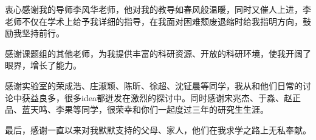 
\begin{acknowledgements}
  衷心感谢我的导师李风华老师，他对我的教导如春风般温暖，同时又催人上进，李老师不仅在学术上给予我详细的指导，在我面对困难颓废退缩时给我指明方向，鼓励我坚持前行。

  感谢课题组的其他老师，为我提供丰富的科研资源、开放的科研环境，使我开阔了眼界，增长了能力。

  感谢实验室的荣成浩、庄淑颖、陈昕、徐超、沈钲晨等同学，我从和他们日常的讨论中获益良多，很多idea都迸发在激烈的探讨中。同时感谢宋兆杰、于淼、赵正品、蓝天鸣、李果等同学，很荣幸和你们一起度过三年的研究生生涯。


  最后，感谢一直以来对我默默支持的父母、家人，他们在我求学之路上无私奉献。

\end{acknowledgements}
